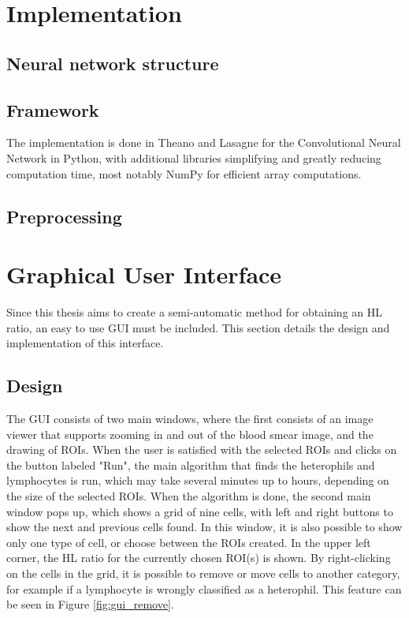 \section{Implementation}\label{sec:research:history}

\subsection{Neural network structure}\label{sec:research:history}

\subsection{Framework}\label{sec:research:history}
The implementation is done in Theano and Lasagne for the Convolutional Neural Network in Python, with additional libraries simplifying and greatly reducing computation time, most notably NumPy for efficient array computations. 

\subsection{Preprocessing}\label{sec:research:history}

\section{Graphical User Interface}
Since this thesis aims to create a semi-automatic method for obtaining an HL ratio, an easy to use GUI must be included. This section details the design and implementation of this interface.

\subsection{Design}
The GUI consists of two main windows, where the first consists of an image viewer that supports zooming in and out of the blood smear image, and the drawing of ROIs. When the user is satisfied with the selected ROIs and clicks on the button labeled "Run", the main algorithm that finds the heterophils and lymphocytes is run, which may take several minutes up to hours, depending on the size of the selected ROIs. When the algorithm is done, the second main window pops up, which shows a grid of nine cells, with left and right buttons to show the next and previous cells found. In this window, it is also possible to show only one type of cell, or choose between the ROIs created. In the upper left corner, the HL ratio for the currently chosen ROI(s) is shown. By right-clicking on the cells in the grid, it is possible to remove or move cells to another category, for example if a lymphocyte is wrongly classified as a heterophil. This feature can be seen in Figure \ref{fig:gui_remove}.

